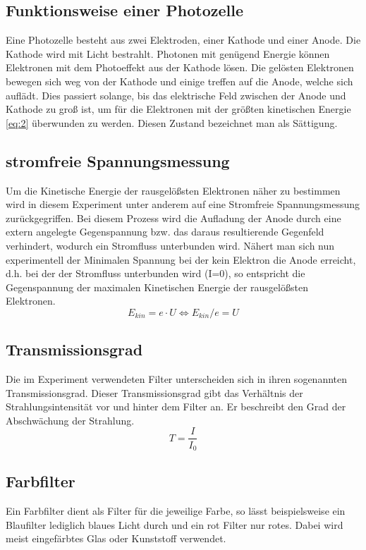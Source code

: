 \documentclass{scrartcl}
\begin{document}
	\subsection{Funktionsweise einer Photozelle}
	Eine Photozelle besteht aus zwei Elektroden, einer Kathode und einer Anode. Die Kathode wird mit Licht bestrahlt.
	 Photonen mit genügend Energie können Elektronen mit dem Photoeffekt aus der Kathode lösen.
	  Die gelösten Elektronen bewegen sich weg von der Kathode und einige treffen auf die Anode, welche sich
	   auflädt. Dies passiert solange, bis das elektrische Feld zwischen der Anode und Kathode zu groß ist,
		um für die Elektronen mit der größten kinetischen Energie \label{eq:2} \ref{eq:2} überwunden zu werden.
		 Diesen Zustand bezeichnet man als Sättigung.
	\subsection{stromfreie Spannungsmessung}
		Um die Kinetische Energie der rausgelößsten Elektronen näher zu bestimmen wird in diesem Experiment unter anderem
		auf eine Stromfreie Spannungsmessung zurückgegriffen. Bei diesem Prozess wird die Aufladung der Anode durch eine 
		extern angelegte Gegenspannung bzw. das daraus resultierende Gegenfeld verhindert, wodurch ein Stromfluss unterbunden wird.
		Nähert man sich nun experimentell der Minimalen Spannung bei der kein Elektron die Anode erreicht, d.h. bei der 
		der Stromfluss unterbunden wird (I=0), so entspricht die Gegenspannung der maximalen Kinetischen Energie der 
		rausgelößsten Elektronen.
		\begin{equation}
			E_{kin} = e \cdot U \Leftrightarrow E_{kin}/e = U
		\end{equation}
	\subsection{Transmissionsgrad}
		Die im Experiment verwendeten Filter unterscheiden sich in ihren sogenannten Transmissionsgrad. Dieser Transmissionsgrad
		gibt das Verhältnis der Strahlungsintensität vor und hinter dem Filter an. Er beschreibt den Grad der Abschwächung der Strahlung.
		\begin{equation}
			T = \frac{I}{I_0}
		\end{equation}
	\subsection{Farbfilter}
		Ein Farbfilter dient als Filter für die jeweilige Farbe, so lässt beispielsweise ein Blaufilter lediglich 
		blaues Licht durch und ein rot Filter nur rotes. Dabei wird meist eingefärbtes Glas oder Kunststoff verwendet.
\end{document}
